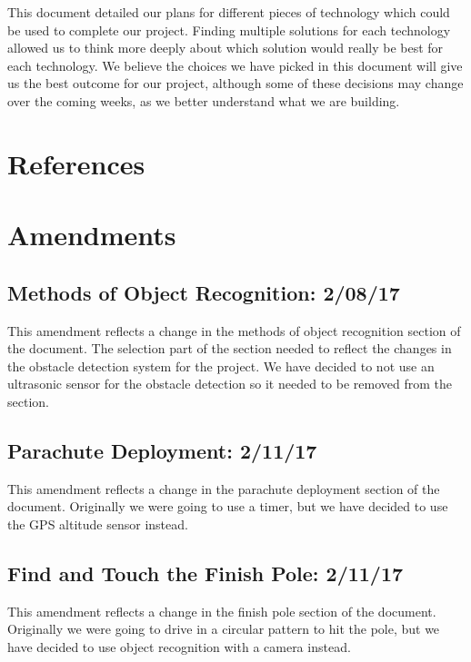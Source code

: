 \documentclass[10pt,letterpaper,onecolumn,journal]{IEEEtran}
\begin{document}
This document detailed our plans for different pieces of technology which could be used to complete our project. Finding multiple solutions for each technology allowed us to think more deeply about which solution would really be best for each technology. We believe the choices we have picked in this document will give us the best outcome for our project, although some of these decisions may change over the coming weeks, as we better understand what we are building.

\section{References}




\section{Amendments}
\subsection{Methods of Object Recognition: 2/08/17}
This amendment reflects a change in the methods of object recognition section of the document. The selection part of the section needed to reflect the changes in the obstacle detection system for the project. We have decided to not use an ultrasonic sensor for the obstacle detection so it needed to be removed from the section.\vspace{.3cm}
\par

\subsection{Parachute Deployment: 2/11/17}
This amendment reflects a change  in the parachute deployment section of the document. Originally we were going to use a timer, but we have decided to use the GPS altitude sensor instead.
\par

\subsection{Find and Touch the Finish Pole: 2/11/17}
This amendment reflects a change in the finish pole section of the document. Originally we were going to drive in a circular pattern to hit the pole, but we have decided to use object recognition with a camera instead.
\par
\end{document}
